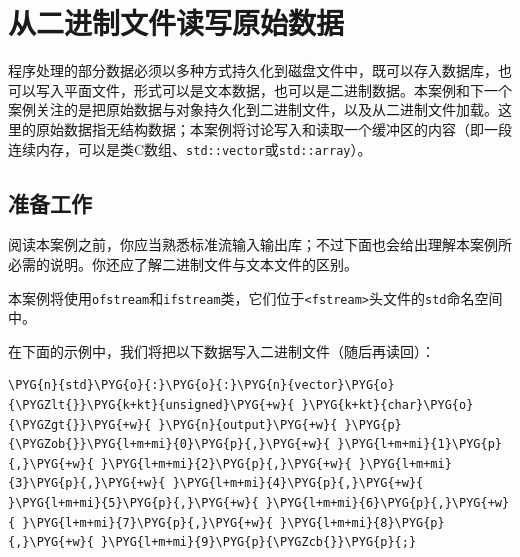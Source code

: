 
\section{从二进制文件读写原始数据}



程序处理的部分数据必须以多种方式持久化到磁盘文件中，既可以存入数据库，也可以写入平面文件，形式可以是文本数据，也可以是二进制数据。本案例和下一个案例关注的是把原始数据与对象持久化到二进制文件，以及从二进制文件加载。这里的原始数据指无结构数据；本案例将讨论写入和读取一个缓冲区的内容（即一段连续内存，可以是类C数组、\texttt{std::\allowbreak{}vector}或\texttt{std::\allowbreak{}array}）。



\subsection{准备工作}



阅读本案例之前，你应当熟悉标准流输入输出库；不过下面也会给出理解本案例所必需的说明。你还应了解二进制文件与文本文件的区别。



本案例将使用\texttt{ofstream}和\texttt{ifstream}类，它们位于\texttt{<\allowbreak{}fstream>}头文件的\texttt{std}命名空间中。



在下面的示例中，我们将把以下数据写入二进制文件（随后再读回）：



\begin{codeblockbg}
\begin{Verbatim}[commandchars=\\\{\},breaklines=true,breakanywhere=true,fontsize=\codefont,xleftmargin=17bp]
\PYG{n}{std}\PYG{o}{:}\PYG{o}{:}\PYG{n}{vector}\PYG{o}{\PYGZlt{}}\PYG{k+kt}{unsigned}\PYG{+w}{ }\PYG{k+kt}{char}\PYG{o}{\PYGZgt{}}\PYG{+w}{ }\PYG{n}{output}\PYG{+w}{ }\PYG{p}{\PYGZob{}}\PYG{l+m+mi}{0}\PYG{p}{,}\PYG{+w}{ }\PYG{l+m+mi}{1}\PYG{p}{,}\PYG{+w}{ }\PYG{l+m+mi}{2}\PYG{p}{,}\PYG{+w}{ }\PYG{l+m+mi}{3}\PYG{p}{,}\PYG{+w}{ }\PYG{l+m+mi}{4}\PYG{p}{,}\PYG{+w}{ }\PYG{l+m+mi}{5}\PYG{p}{,}\PYG{+w}{ }\PYG{l+m+mi}{6}\PYG{p}{,}\PYG{+w}{ }\PYG{l+m+mi}{7}\PYG{p}{,}\PYG{+w}{ }\PYG{l+m+mi}{8}\PYG{p}{,}\PYG{+w}{ }\PYG{l+m+mi}{9}\PYG{p}{\PYGZcb{}}\PYG{p}{;}
\end{Verbatim}
\end{codeblockbg}


